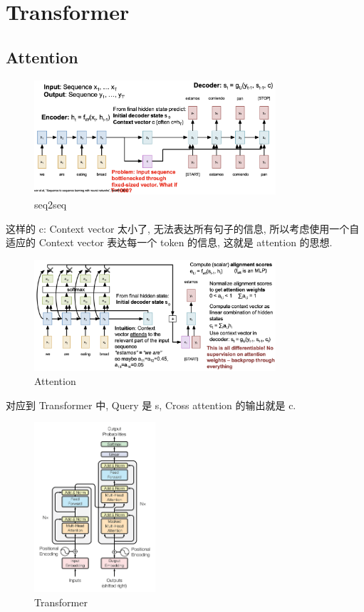 \section{Transformer}

\subsection{Attention}

\begin{figure}[htbp]
    \centering
    \includegraphics[width=0.8\textwidth]{figures/seq2seq.png}
    \caption{seq2seq}
    \label{fig:seq2seq}
\end{figure}

这样的 c: Context vector 太小了, 无法表达所有句子的信息, 所以考虑使用一个自适应的 Context vector 表达每一个 token 的信息, 这就是 attention 的思想.

\begin{figure}[htbp]
    \centering
    \includegraphics[width=0.8\textwidth]{figures/attention.png}
    \caption{Attention}
    \label{fig:Attention}
\end{figure}

对应到 Transformer 中, Query 是 s, Cross attention 的输出就是 c.

\begin{figure}[htbp]
    \centering
    \includegraphics[width=0.4\textwidth]{figures/Transformer.png}
    \caption{Transformer}
    \label{fig:Transformer}
\end{figure}

